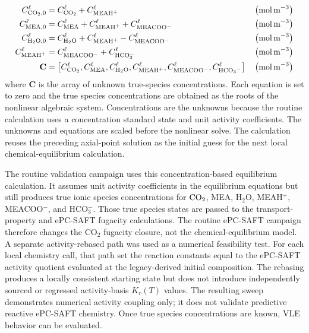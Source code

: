                 \begin{align}
                    C^{\liq}_{\ce{CO2},0} &= C^{\liq}_{\ce{CO2}} + C^{\liq}_{\ce{MEAH}^{+}}
                    && \left(\unit{mol\,m^{-3}}\right)\\
                    C^{\liq}_{\ce{MEA},0} &= C^{\liq}_{\ce{MEA}} + C^{\liq}_{\ce{MEAH}^{+}} + C^{\liq}_{\ce{MEACOO}^{-}}
                    && \left(\unit{mol\,m^{-3}}\right)\\
                    C^{\liq}_{\ce{H2O},0} &= C^{\liq}_{\ce{H2O}} + C^{\liq}_{\ce{MEAH}^{+}} - C^{\liq}_{\ce{MEACOO}^{-}}
                    && \left(\unit{mol\,m^{-3}}\right)\\
                    C^{\liq}_{\ce{MEAH}^{+}} &= C^{\liq}_{\ce{MEACOO}^{-}} + C^{\liq}_{\ce{HCO3}^{-}}
                    && \left(\unit{mol\,m^{-3}}\right)\\
                    \textbf{C} &= \left[
                         C^{\liq}_{\COtwo}, C^{\liq}_{\MEA}, C^{\liq}_{\HtwoO}, C^{\liq}_{\MEAH}, C^{\liq}_{\MEACOO}, C^{\liq}_{\HCOthree}\right]
                    && \left(\unit{mol\,m^{-3}}\right)
                \end{align}
                where $\textbf{C}$ is the array of unknown true-species concentrations.
                Each equation is set to zero and the true species concentrations are obtained as the roots of the nonlinear algebraic system. Concentrations are the unknowns because the routine calculation uses a concentration standard state and unit activity coefficients. The unknowns and equations are scaled before the nonlinear solve. The calculation reuses the preceding axial-point solution as the initial guess for the next local chemical-equilibrium calculation.

                The routine validation campaign uses this concentration-based equilibrium calculation. It assumes unit activity coefficients in the equilibrium equations but still produces true ionic species concentrations for $\COtwo$, MEA, H$_2$O, MEAH$^+$, MEACOO$^-$, and HCO$_3^-$. Those true species states are passed to the transport-property and ePC-SAFT fugacity calculations. The routine ePC-SAFT campaign therefore changes the CO$_2$ fugacity closure, not the chemical-equilibrium model. A separate activity-rebased path was used as a numerical feasibility test. For each local chemistry call, that path set the reaction constants equal to the ePC-SAFT activity quotient evaluated at the legacy-derived initial composition. The rebasing produces a locally consistent starting state but does not introduce independently sourced or regressed activity-basis $K_r(T)$ values. The resulting sweep demonstrates numerical activity coupling only; it does not validate predictive reactive ePC-SAFT chemistry. Once true species concentrations are known, VLE behavior can be evaluated.


